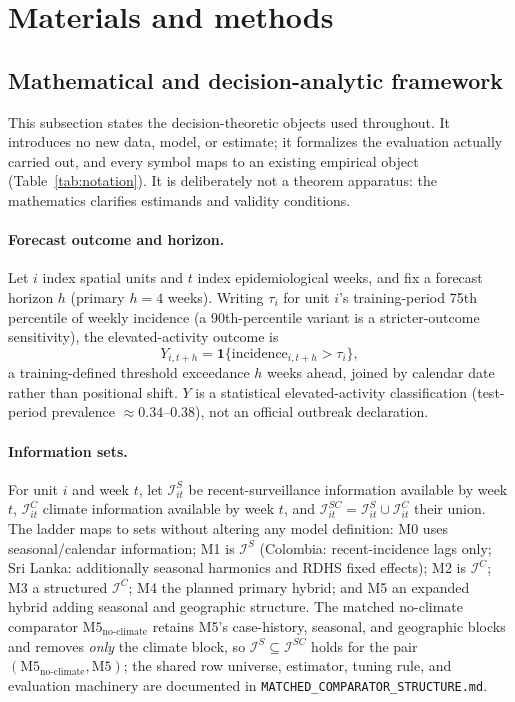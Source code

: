 \documentclass[11pt,a4paper]{article}
\begin{document}
\section{Materials and methods}

\subsection{Mathematical and decision-analytic framework}\label{sec:framework}
This subsection states the decision-theoretic objects used throughout. It introduces no new data, model, or estimate; it formalizes the evaluation actually carried out, and every symbol maps to an existing empirical object (Table~\ref{tab:notation}). It is deliberately not a theorem apparatus: the mathematics clarifies estimands and validity conditions.

\paragraph{Forecast outcome and horizon.}
Let $i$ index spatial units and $t$ index epidemiological weeks, and fix a forecast horizon $h$ (primary $h=4$ weeks). Writing $\tau_i$ for unit $i$'s training-period 75th percentile of weekly incidence (a 90th-percentile variant is a stricter-outcome sensitivity), the elevated-activity outcome is
\[
Y_{i,t+h}=\mathbf 1\{\text{incidence}_{i,t+h}>\tau_i\},
\]
a training-defined threshold exceedance $h$ weeks ahead, joined by calendar date rather than positional shift. $Y$ is a statistical elevated-activity classification (test-period prevalence $\approx0.34$--$0.38$), not an official outbreak declaration.

\paragraph{Information sets.}
For unit $i$ and week $t$, let $\mathcal I^{S}_{it}$ be recent-surveillance information available by week $t$, $\mathcal I^{C}_{it}$ climate information available by week $t$, and $\mathcal I^{SC}_{it}=\mathcal I^{S}_{it}\cup\mathcal I^{C}_{it}$ their union. The ladder maps to sets without altering any model definition: M0 uses seasonal/calendar information; M1 is $\mathcal I^{S}$ (Colombia: recent-incidence lags only; Sri Lanka: additionally seasonal harmonics and RDHS fixed effects); M2 is $\mathcal I^{C}$; M3 a structured $\mathcal I^{C}$; M4 the planned primary hybrid; and M5 an expanded hybrid adding seasonal and geographic structure. The matched no-climate comparator $\text{M5}_{\text{no-climate}}$ retains M5's case-history, seasonal, and geographic blocks and removes \emph{only} the climate block, so $\mathcal I^{S}\subseteq\mathcal I^{SC}$ holds for the pair $(\text{M5}_{\text{no-climate}},\text{M5})$; the shared row universe, estimator, tuning rule, and evaluation machinery are documented in \texttt{MATCHED\_COMPARATOR\_STRUCTURE.md}.
\end{document}
